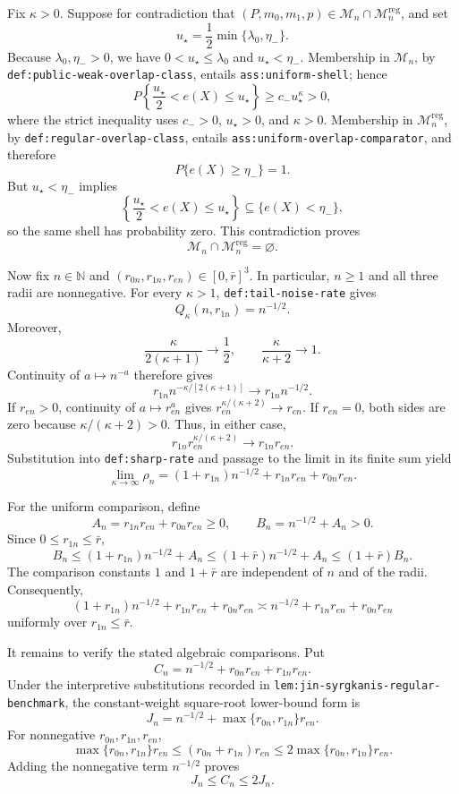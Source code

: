 Fix \(\kappa>0\). Suppose for contradiction that \((P,m_0,m_1,p)\in\mathcal M_n\cap\mathcal M_n^{\mathrm{reg}}\), and set
\[
u_\star=\frac12\min\{\lambda_0,\eta_-\}.
\]
Because \(\lambda_0,\eta_->0\), we have \(0<u_\star\le\lambda_0\) and \(u_\star<\eta_-\). Membership in \(\mathcal M_n\), by \texttt{def:public-weak-overlap-class}, entails \texttt{ass:uniform-shell}; hence
\[
P\!\left\{\frac{u_\star}{2}<e(X)\le u_\star\right\}
\ge c_-u_\star^\kappa>0,
\]
where the strict inequality uses \(c_->0\), \(u_\star>0\), and \(\kappa>0\). Membership in \(\mathcal M_n^{\mathrm{reg}}\), by \texttt{def:regular-overlap-class}, entails \texttt{ass:uniform-overlap-comparator}, and therefore
\[
P\{e(X)\ge\eta_-\}=1.
\]
But \(u_\star<\eta_-\) implies
\[
\left\{\frac{u_\star}{2}<e(X)\le u_\star\right\}
\subseteq\{e(X)<\eta_-\},
\]
so the same shell has probability zero. This contradiction proves
\[
\mathcal M_n\cap\mathcal M_n^{\mathrm{reg}}=\varnothing.
\]

Now fix \(n\in\mathbb N\) and \((r_{0n},r_{1n},r_{en})\in[0,\bar r]^3\). In particular, \(n\ge1\) and all three radii are nonnegative. For every \(\kappa>1\), \texttt{def:tail-noise-rate} gives
\[
Q_\kappa(n,r_{1n})=n^{-1/2}.
\]
Moreover,
\[
\frac{\kappa}{2(\kappa+1)}\longrightarrow\frac12,
\qquad
\frac{\kappa}{\kappa+2}\longrightarrow1.
\]
Continuity of \(a\mapsto n^{-a}\) therefore gives
\[
r_{1n}n^{-\kappa/[2(\kappa+1)]}
\longrightarrow r_{1n}n^{-1/2}.
\]
If \(r_{en}>0\), continuity of \(a\mapsto r_{en}^{a}\) gives \(r_{en}^{\kappa/(\kappa+2)}\to r_{en}\). If \(r_{en}=0\), both sides are zero because \(\kappa/(\kappa+2)>0\). Thus, in either case,
\[
r_{1n}r_{en}^{\kappa/(\kappa+2)}
\longrightarrow r_{1n}r_{en}.
\]
Substitution into \texttt{def:sharp-rate} and passage to the limit in its finite sum yield
\[
\lim_{\kappa\to\infty}\rho_n
=(1+r_{1n})n^{-1/2}+r_{1n}r_{en}+r_{0n}r_{en}.
\]

For the uniform comparison, define
\[
A_n=r_{1n}r_{en}+r_{0n}r_{en}\ge0,
\qquad
B_n=n^{-1/2}+A_n>0.
\]
Since \(0\le r_{1n}\le\bar r\),
\[
B_n
\le (1+r_{1n})n^{-1/2}+A_n
\le (1+\bar r)n^{-1/2}+A_n
\le (1+\bar r)B_n.
\]
The comparison constants \(1\) and \(1+\bar r\) are independent of \(n\) and of the radii. Consequently,
\[
(1+r_{1n})n^{-1/2}+r_{1n}r_{en}+r_{0n}r_{en}
\asymp n^{-1/2}+r_{1n}r_{en}+r_{0n}r_{en}
\]
uniformly over \(r_{1n}\le\bar r\).

It remains to verify the stated algebraic comparisons. Put
\[
C_n=n^{-1/2}+r_{0n}r_{en}+r_{1n}r_{en}.
\]
Under the interpretive substitutions recorded in \texttt{lem:jin-syrgkanis-regular-benchmark}, the constant-weight square-root lower-bound form is
\[
J_n=n^{-1/2}+\max\{r_{0n},r_{1n}\}r_{en}.
\]
For nonnegative \(r_{0n},r_{1n},r_{en}\),
\[
\max\{r_{0n},r_{1n}\}r_{en}
\le(r_{0n}+r_{1n})r_{en}
\le2\max\{r_{0n},r_{1n}\}r_{en}.
\]
Adding the nonnegative term \(n^{-1/2}\) proves
\[
J_n\le C_n\le2J_n.
\]

